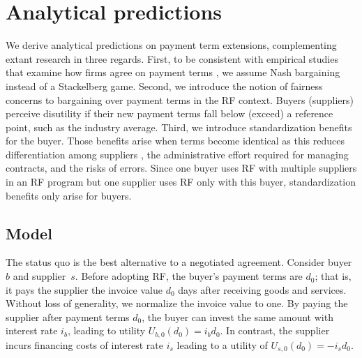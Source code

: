 \documentclass[a4paper,11pt]{article}
\renewcommand{\~}[1]{\tilde{#1}}
\renewcommand{\-}[1]{\overline{#1}}
\begin{document}
\section{Analytical predictions}\label{sec:model}
We derive analytical predictions on payment term extensions, complementing extant research in three regards. First, to be consistent with empirical studies that examine how firms agree on payment terms \citep{Fabbri2016, Summers2002}, we assume Nash bargaining instead of a Stackelberg game. Second, we introduce the notion of fairness concerns \citep{Cappelen2007, Cui2007,banerjee2021} to bargaining over payment terms in the RF context. Buyers (suppliers) perceive disutility if their new payment terms fall below (exceed) a reference point, such as the industry average. Third, we introduce standardization benefits for the buyer. Those benefits arise when terms become identical as this reduces differentiation among suppliers \citep{Peura2017}, the administrative effort required for managing contracts, and the risks of errors. Since one buyer uses RF with multiple suppliers in an RF program but one supplier uses RF only with this buyer, standardization benefits only arise for buyers.

\subsection{Model}
The status quo is the best alternative to a negotiated agreement. Consider buyer $b$ and supplier~$s$. Before adopting RF, the buyer's payment terms are $d_0$; that is, it pays the supplier the invoice value $d_0$ days after receiving goods and services. Without loss of generality, we normalize the invoice value to one. By paying the supplier after payment terms $d_0$, the buyer can invest the same amount with interest rate $i_b$, leading to utility $U_{b,0}\left(d_0\right)=i_bd_0$. In contrast, the supplier incurs financing costs of interest rate $i_s$ leading to a utility of $U_{s,0}\left(d_0\right)=-i_sd_0$.
\end{document}
